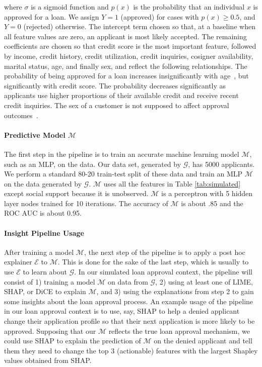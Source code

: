 \documentclass[11pt]{article}    %
\begin{document}
where $\sigma$ is a sigmoid function and $p(x)$ is the probability that an individual $x$ is approved for a loan.
We assign $Y = 1$ (approved) for cases with $p(x)\geq 0.5$, and $Y = 0$ (rejected) otherwise. The intercept term chosen so that, at a baseline when all feature values are zero, an applicant is most likely accepted. The remaining coefficients are chosen so that credit score is the most important feature, followed by income, credit history, credit utilization, credit inquiries, cosigner availability, marital status, age, and finally sex, and reflect the following relationships. The probability of being approved for a loan increases insignificantly with age~\citep{cfb_age}, but significantly with credit score. The probability decreases significantly as applicants use higher proportions of their available credit and receive recent credit inquiries. The sex of a customer is not supposed to affect approval outcomes~\citep{Calcagnini2014}. 

\paragraph{Predictive Model $\mathcal{M}$}
The first step in the pipeline is to train an accurate machine learning model $\mathcal{M}$, such as an MLP, on the data. Our data set, generated by $\mathcal{G}$, has 5000 applicants.  We perform a standard 80-20 train-test split of these data and train an MLP $\mathcal{M}$ on the data generated by $\mathcal{G}$. $\mathcal{M}$ uses all the features in Table \ref{tab:simulated} except social support because it is unobserved. $\mathcal{M}$ is a perceptron with 5 hidden layer nodes trained for 10 iterations. The accuracy of $\mathcal{M}$ is about .85 and the ROC AUC is about 0.95. 

\paragraph{Insight Pipeline Usage}
After training a model $\mathcal{M}$, the next step of the pipeline is to apply a post hoc explainer $\mathcal{E}$ to $\mathcal{M}$. This is done for the sake of the last step, which is usually to use $\mathcal{E}$ to learn about $\mathcal{G}$. In our simulated loan approval context, the pipeline will consist of 1) training a model $\mathcal{M}$ on data from $\mathcal{G}$, 2) using at least one of LIME, SHAP, or DiCE to explain $\mathcal{M}$, and 3) using the explanations from step 2 to gain some insights about the loan approval process. An example usage of the pipeline in our loan approval context is to use, say, SHAP to help a denied applicant change their application profile so that their next application is more likely to be approved. Supposing  that our $\mathcal{M}$  reflects the true loan approval mechanism, we could use SHAP to explain the prediction of $\mathcal{M}$ on the denied applicant and tell them they need to change the top 3 (actionable) features with the largest Shapley values obtained from SHAP.
\end{document}
